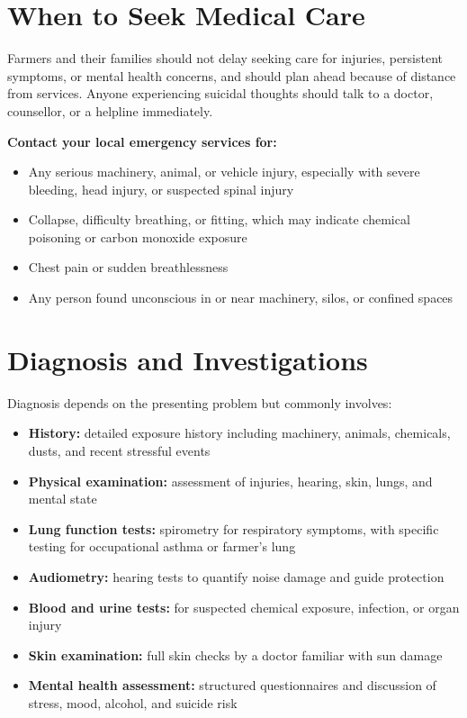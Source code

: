\section*{When to Seek Medical Care}
Farmers and their families should not delay seeking care for injuries, persistent symptoms, or mental health concerns, and should plan ahead because of distance from services. Anyone experiencing suicidal thoughts should talk to a doctor, counsellor, or a helpline immediately.

\textbf{Contact your local emergency services for:}
\begin{itemize}
    \item Any serious machinery, animal, or vehicle injury, especially with severe bleeding, head injury, or suspected spinal injury
    \item Collapse, difficulty breathing, or fitting, which may indicate chemical poisoning or carbon monoxide exposure
    \item Chest pain or sudden breathlessness
    \item Any person found unconscious in or near machinery, silos, or confined spaces
\end{itemize}

\section*{Diagnosis and Investigations}
Diagnosis depends on the presenting problem but commonly involves:
\begin{itemize}
    \item \textbf{History:} detailed exposure history including machinery, animals, chemicals, dusts, and recent stressful events
    \item \textbf{Physical examination:} assessment of injuries, hearing, skin, lungs, and mental state
    \item \textbf{Lung function tests:} spirometry for respiratory symptoms, with specific testing for occupational asthma or farmer's lung
    \item \textbf{Audiometry:} hearing tests to quantify noise damage and guide protection
    \item \textbf{Blood and urine tests:} for suspected chemical exposure, infection, or organ injury
    \item \textbf{Skin examination:} full skin checks by a doctor familiar with sun damage
    \item \textbf{Mental health assessment:} structured questionnaires and discussion of stress, mood, alcohol, and suicide risk
\end{itemize}


